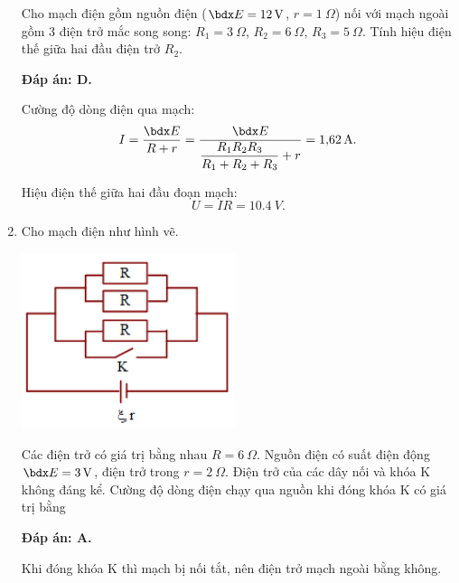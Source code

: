 \begin{enumerate}[label=\bfseries Câu \arabic*:]
	\cauhoi
	{Cho mạch điện gồm nguồn điện ($\calE=\SI{12}{V}$, $r=\SI{1}{\Omega}$) nối với mạch ngoài gồm 3 điện trở mắc song song: $R_1=\SI{3}{\Omega}$, $R_2=\SI{6}{\Omega}$, $R_3=\SI{5}{\Omega}$. Tính hiệu điện thế giữa hai đầu điện trở $R_2$.
		
	}
	\loigiai
	{	\textbf{Đáp án: D.}
		
		Cường độ dòng điện qua mạch:
		$$I=\dfrac{\calE}{R+r} = \dfrac{\calE}{\dfrac{R_1 R_2 R_3}{R_1 + R_2 + R_3} + r} = \SI{1.62}{A}.$$
		
		Hiệu điện thế giữa hai đầu đoạn mạch:
		$$U=I R = \SI{10.4}{V}.$$
	}
	\item {}
	
	\cauhoi
	{Cho mạch điện như hình vẽ.
		\begin{center}
			\includegraphics{../figs/VN11-2021-PH-TP016-1.png}
		\end{center}
	Các điện trở có giá trị bằng nhau $R=\SI{6}{\Omega}$. Nguồn điện có suất điện động $\calE=\SI{3}{V}$, điện trở trong $r=\SI{2}{\Omega}$. Điện trở của các dây nối và khóa K không đáng kể. Cường độ dòng điện chạy qua nguồn khi đóng khóa K có giá trị bằng
		
	}
	\loigiai
	{	\textbf{Đáp án: A.}
		
		Khi đóng khóa K thì mạch bị nối tắt, nên điện trở mạch ngoài bằng không.
		
}
\end{enumerate}
